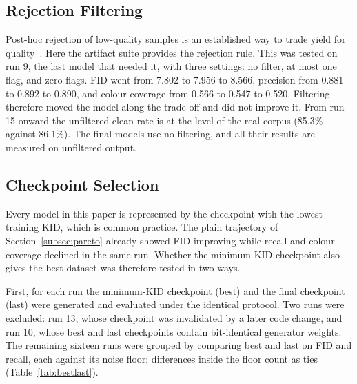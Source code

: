\documentclass[electronics,article,submit,pdftex,moreauthors]{Definitions/mdpi}
\begin{document}
\subsection{Rejection Filtering}
\label{subsec:filtering}

Post-hoc rejection of low-quality samples is an established way to trade
yield for quality~\cite{azadi2019drs}. Here the artifact suite provides the
rejection rule. This was tested on run 9, the last model that needed it, with
three settings: no filter, at most one flag, and zero flags. FID went from
7.802 to 7.956 to 8.566, precision from 0.881 to 0.892 to 0.890, and colour
coverage from 0.566 to 0.547 to 0.520. Filtering therefore moved the model
along the trade-off and did not improve it. From run 15 onward the unfiltered
clean rate is at the level of the real corpus (85.3\% against 86.1\%). The
final models use no filtering, and all their results are measured on
unfiltered output.

\subsection{Checkpoint Selection}
\label{sec:checkpoints}

Every model in this paper is represented by the checkpoint with the lowest
training KID, which is common practice. The plain trajectory of
Section~\ref{subsec:pareto} already showed FID improving while recall and
colour coverage declined in the same run. Whether the minimum-KID checkpoint
also gives the best dataset was therefore tested in two ways.

First, for each run the minimum-KID checkpoint (best) and the final
checkpoint (last) were generated and evaluated under the identical protocol.
Two runs were excluded: run 13, whose checkpoint was invalidated by a later
code change, and run 10, whose best and last checkpoints contain bit-identical
generator weights. The remaining sixteen runs were grouped by comparing best
and last on FID and recall, each against its noise floor; differences inside
the floor count as ties (Table~\ref{tab:bestlast}).
\end{document}
